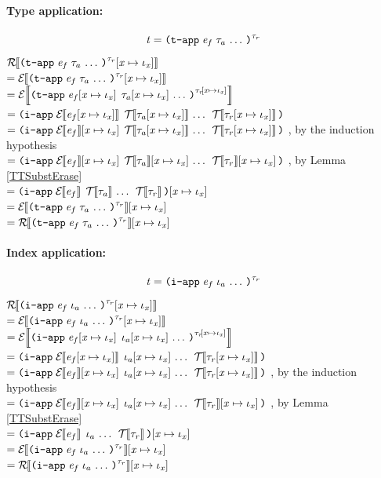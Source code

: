 \begin{sproof}
  \paragraph{Type application:}
  \[\term = \notedtapp[\type_r]{\expr_f}{\sequence{\type_a}}\]
  $\EraseTrm{\idxsubst{\notedtapp[\type_r]{\expr_f}{\sequence{\type_a}}}}$ \\
  $= \EraseE{\idxsubst{\notedtapp[\type_r]{\expr_f}{\sequence{\type_a}}}}$ \\
  $= \EraseE{\notedtapp[\idxsubst{\type_r}]{\idxsubst{\expr_f}}{\sequence{\idxsubst{\type_a}}}}$ \\
  $= \iapp{\EraseE{\idxsubst{\expr_f}}}{\sequence{\EraseT{\idxsubst{\type_a}}}\;\EraseT{\idxsubst{\type_r}}}$ \\
  $= \iapp{\idxsubst{\EraseE{\expr_f}}}{\sequence{\EraseT{\idxsubst{\type_a}}}\;\EraseT{\idxsubst{\type_r}}}$%
  , by the induction hypothesis \\
  $= \iapp{\idxsubst{\EraseE{\expr_f}}}{\sequence{\idxsubst{\EraseT{\type_a}}}\;\idxsubst{\EraseT{\type_r}}}$%
  , by Lemma \ref{TTSubstErase} \\
  $= \idxsubst{\iapp{\EraseE{\expr_f}}{\sequence{\EraseT{\type_a}}\;\EraseT{\type_r}}}$ \\
  $= \idxsubst{\EraseE{\notedtapp[\type_r]{\expr_f}{\sequence{\type_a}}}}$ \\
  $= \idxsubst{\EraseTrm{\notedtapp[\type_r]{\expr_f}{\sequence{\type_a}}}}$ \\

  \paragraph{Index application:}
  \[\term = \notediapp[\type_r]{\expr_f}{\sequence{\idx_a}}\]
  $\EraseTrm{\idxsubst{\notediapp[\type_r]{\expr_f}{\sequence{\idx_a}}}}$ \\
  $= \EraseE{\idxsubst{\notediapp[\type_r]{\expr_f}{\sequence{\idx_a}}}}$ \\
  $= \EraseE{\notediapp[\idxsubst{\type_r}]{\idxsubst{\expr_f}}{\sequence{\idxsubst{\idx_a}}}}$ \\
  $= \iapp{\EraseE{\idxsubst{\expr_f}}}{\sequence{\idxsubst{\idx_a}}\;\EraseT{\idxsubst{\type_r}}}$ \\
  $= \iapp{\idxsubst{\EraseE{\expr_f}}}{\sequence{\idxsubst{\idx_a}}\;\EraseT{\idxsubst{\type_r}}}$%
  , by the induction hypothesis \\
  $= \iapp{\idxsubst{\EraseE{\expr_f}}}{\sequence{\idxsubst{\idx_a}}\;\idxsubst{\EraseT{\type_r}}}$%
  , by Lemma \ref{TTSubstErase} \\
  $= \idxsubst{\iapp{\EraseE{\expr_f}}{\sequence{\idx_a}\;\EraseT{\type_r}}}$ \\
  $= \idxsubst{\EraseE{\notediapp[\type_r]{\expr_f}{\sequence{\idx_a}}}}$ \\
  $= \idxsubst{\EraseTrm{\notediapp[\type_r]{\expr_f}{\sequence{\idx_a}}}}$ \\


\end{sproof}
